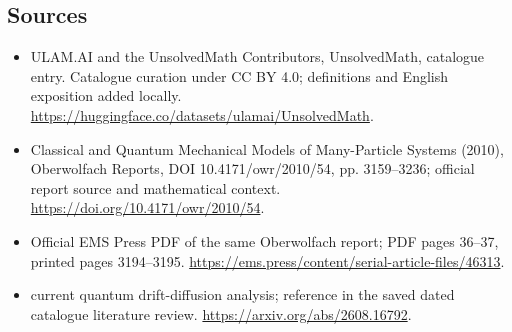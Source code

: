 \documentclass[11pt]{article}
\begin{document}
\subsection{Sources}
\begin{itemize}
\item[\hypertarget{source:statement:1}{S1}] ULAM.AI and the UnsolvedMath Contributors, UnsolvedMath, catalogue entry. Catalogue curation under CC BY 4.0; definitions and English exposition added locally.
\url{https://huggingface.co/datasets/ulamai/UnsolvedMath}.
\item[\hypertarget{source:statement:2}{S2}] Classical and Quantum Mechanical Models of Many-Particle Systems (2010), Oberwolfach Reports, DOI 10.4171/owr/2010/54, pp. 3159--3236; official report source and mathematical context.
\url{https://doi.org/10.4171/owr/2010/54}.
\item[\hypertarget{source:statement:3}{S3}] Official EMS Press PDF of the same Oberwolfach report; PDF pages 36--37, printed pages 3194--3195.
\url{https://ems.press/content/serial-article-files/46313}.
\item[\hypertarget{source:statement:4}{S4}] current quantum drift-diffusion analysis; reference in the saved dated catalogue literature review.
\url{https://arxiv.org/abs/2608.16792}.
\end{itemize}
\label{end:statement}
\end{document}

